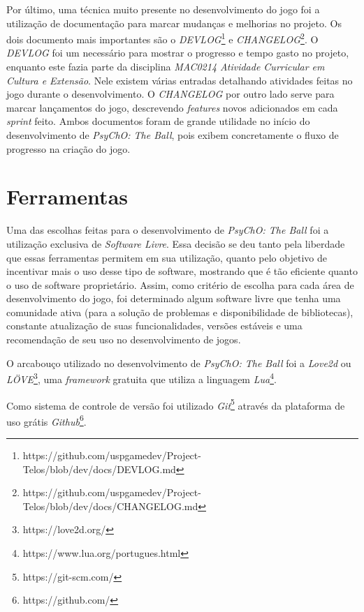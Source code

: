 Por último, uma técnica muito presente no desenvolvimento do jogo foi a utilização de documentação para marcar mudanças e melhorias no projeto. Os dois documento mais importantes são o \textit{DEVLOG}\footnote{https://github.com/uspgamedev/Project-Telos/blob/dev/docs/DEVLOG.md} e \textit{CHANGELOG}\footnote{https://github.com/uspgamedev/Project-Telos/blob/dev/docs/CHANGELOG.md}. O \textit{DEVLOG} foi um necessário para mostrar o progresso e tempo gasto no projeto, enquanto este fazia parte da disciplina \textit{MAC0214 Atividade Curricular em Cultura e Extensão}. Nele existem várias entradas detalhando atividades feitas no jogo durante o desenvolvimento. O \textit{CHANGELOG} por outro lado serve para marcar lançamentos do jogo, descrevendo \textit{features} novos adicionados em cada \textit{sprint} feito. Ambos documentos foram de grande utilidade no início do desenvolvimento de \textit{PsyChO: The Ball}, pois exibem concretamente o fluxo de progresso na criação do jogo.

\section{Ferramentas}
\label{sec:ferramentas}

Uma das escolhas feitas para o desenvolvimento de \textit{PsyChO: The Ball} foi a utilização exclusiva de \textit{Software Livre}. Essa decisão se deu tanto pela liberdade que essas ferramentas permitem em sua utilização, quanto pelo objetivo de incentivar mais o uso desse tipo de software, mostrando que é tão eficiente quanto o uso de software proprietário. Assim, como critério de escolha para cada área de desenvolvimento do jogo, foi determinado algum software livre que tenha uma comunidade ativa (para a solução de problemas e disponibilidade de bibliotecas), constante atualização de suas funcionalidades, versões estáveis e uma recomendação de seu uso no desenvolvimento de jogos.

O arcabouço utilizado no desenvolvimento de \textit{PsyChO: The Ball} foi a \textit{Love2d} ou \textit{LÖVE}\footnote{https://love2d.org/}, uma \textit{framework} gratuita que utiliza a linguagem \textit{Lua}\footnote{https://www.lua.org/portugues.html}.

Como sistema de controle de versão foi utilizado \textit{Git}\footnote{https://git-scm.com/} através da plataforma de uso grátis \textit{Github}\footnote{https://github.com/}.


